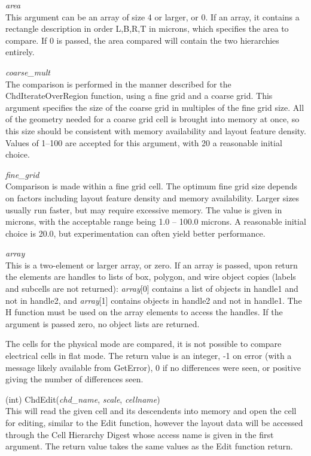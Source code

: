 \begin{description}
\begin{description}
\item{\it area}\\
This argument can be an array of size 4 or larger, or 0.  If an array,
it contains a rectangle description in order L,B,R,T in microns, which
specifies the area to compare.  If 0 is passed, the area compared will
contain the two hierarchies entirely.

\item{\it coarse\_mult}\\
The comparison is performed in the manner described for the {\vt
ChdIterateOverRegion} function, using a fine grid and a coarse grid. 
This argument specifies the size of the coarse grid in multiples of
the fine grid size.  All of the geometry needed for a coarse grid cell
is brought into memory at once, so this size should be consistent with
memory availability and layout feature density.  Values of 1--100 are
accepted for this argument, with 20 a reasonable initial choice.

\item{\it fine\_grid}\\
Comparison is made within a fine grid cell.  The optimum fine grid
size depends on factors including layout feature density and memory
availability.  Larger sizes usually run faster, but may require
excessive memory.  The value is given in microns, with the acceptable
range being 1.0 -- 100.0 microns.  A reasonable initial choice is
20.0, but experimentation can often yield better performance.

\item{\it array}\\
This is a two-element or larger array, or zero.  If an array is
passed, upon return the elements are handles to lists of box, polygon,
and wire object copies (labels and subcells are not returned):  {\it
array\/}[0] contains a list of objects in handle1 and not in handle2,
and {\it array\/}[1] contains objects in handle2 and not in handle1. 
The {\vt H} function must be used on the array elements to access the
handles.  If the argument is passed zero, no object lists are
returned.
\end{description}

The cells for the physical mode are compared, it is not possible to
compare electrical cells in flat mode.  The return value is an
integer, -1 on error (with a message likely available from {\vt
GetError}), 0 if no differences were seen, or positive giving the
number of differences seen.

\item{(int) \vt ChdEdit({\it chd\_name\/}, {\it scale\/}, {\it cellname\/})}\\
This will read the given cell and its descendents into memory and open
the cell for editing, similar to the {\vt Edit} function, however the
layout data will be accessed through the Cell Hierarchy Digest whose
access name is given in the first argument.  The return value takes
the same values as the {\vt Edit} function return.


\end{description}
